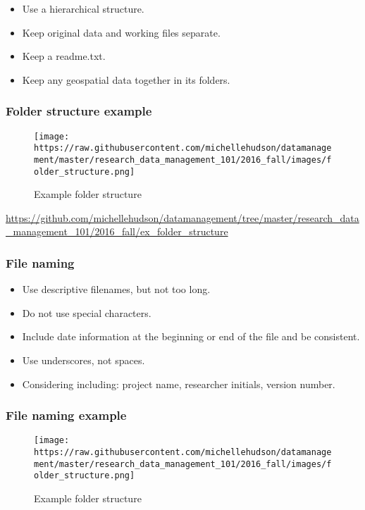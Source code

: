 \begin{itemize}
\tightlist
\item
  Use a hierarchical structure.
\item
  Keep original data and working files separate.
\item
  Keep a readme.txt.
\item
  Keep any geospatial data together in its folders.
\end{itemize}

\subsubsection{Folder structure example}\label{folder-structure-example}

\begin{figure}[htbp]
\centering
\texttt{[image: https://raw.githubusercontent.com/michellehudson/datamanagement/master/research\_data\_management\_101/2016\_fall/images/folder\_structure.png]}
\caption{Example folder structure}
\end{figure}

\url{https://github.com/michellehudson/datamanagement/tree/master/research_data_management_101/2016_fall/ex_folder_structure}

\subsubsection{File naming}\label{file-naming}

\begin{itemize}
\tightlist
\item
  Use descriptive filenames, but not too long.
\item
  Do not use special characters.
\item
  Include date information at the beginning or end of the file and be
  consistent.
\item
  Use underscores, not spaces.
\item
  Considering including: project name, researcher initials, version
  number.
\end{itemize}

\subsubsection{File naming example}\label{file-naming-example}

\begin{figure}[htbp]
\centering
\texttt{[image: https://raw.githubusercontent.com/michellehudson/datamanagement/master/research\_data\_management\_101/2016\_fall/images/folder\_structure.png]}
\caption{Example folder structure}
\end{figure}

